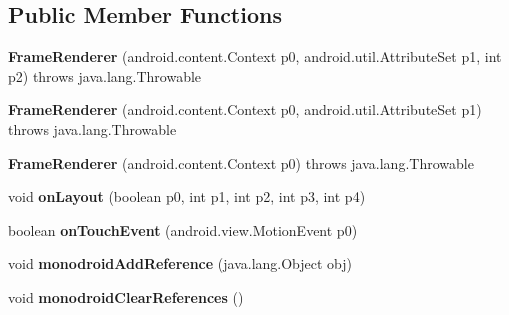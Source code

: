 \subsection*{Public Member Functions}
\begin{DoxyCompactItemize}
\item 
\mbox{\label{classmd57018357d52b54713cd814fbd5262dd1f_1_1FrameRenderer_af14bbf276a028d7c7d94a1530288998c}} 
{\bfseries Frame\+Renderer} (android.\+content.\+Context p0, android.\+util.\+Attribute\+Set p1, int p2)  throws java.\+lang.\+Throwable 	
\item 
\mbox{\label{classmd57018357d52b54713cd814fbd5262dd1f_1_1FrameRenderer_a4d6af57c34847b40d0d23873adb2b744}} 
{\bfseries Frame\+Renderer} (android.\+content.\+Context p0, android.\+util.\+Attribute\+Set p1)  throws java.\+lang.\+Throwable 	
\item 
\mbox{\label{classmd57018357d52b54713cd814fbd5262dd1f_1_1FrameRenderer_ad9ccbd927d3475ddc5925f7a5ac54325}} 
{\bfseries Frame\+Renderer} (android.\+content.\+Context p0)  throws java.\+lang.\+Throwable 	
\item 
\mbox{\label{classmd57018357d52b54713cd814fbd5262dd1f_1_1FrameRenderer_aaf0948288e17edaaabea73769edf9c2a}} 
void {\bfseries on\+Layout} (boolean p0, int p1, int p2, int p3, int p4)
\item 
\mbox{\label{classmd57018357d52b54713cd814fbd5262dd1f_1_1FrameRenderer_aea790f7f0f5e6f35f6ba260beeea4479}} 
boolean {\bfseries on\+Touch\+Event} (android.\+view.\+Motion\+Event p0)
\item 
\mbox{\label{classmd57018357d52b54713cd814fbd5262dd1f_1_1FrameRenderer_a14f0719110866c6f4a0475fbfc1ce2ad}} 
void {\bfseries monodroid\+Add\+Reference} (java.\+lang.\+Object obj)
\item 
\mbox{\label{classmd57018357d52b54713cd814fbd5262dd1f_1_1FrameRenderer_a7c48666937065ca752fc6c9435980aaa}} 
void {\bfseries monodroid\+Clear\+References} ()
\end{DoxyCompactItemize}

